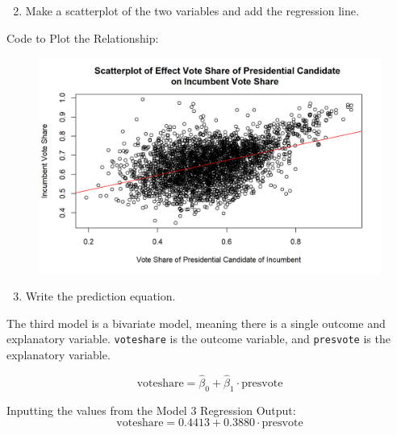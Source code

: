 \documentclass[12pt,letterpaper]{article}
\begin{document}
\newpage
\noindent\begin{enumerate}[left=0pt]
\setcounter{enumi}{1}	
		\item Make a scatterplot of the two variables and add the regression line. 
\end{enumerate}		

\noindent Code to Plot the Relationship:

\begin{figure}[H]
	\centering
	\includegraphics[width=1\textwidth]{Figure_3_1.png}
\end{figure}

\noindent\begin{enumerate}[left=0pt]		
\setcounter{enumi}{2}	
		\item Write the prediction equation.
	\end{enumerate}
	
\vspace{0.25cm}
\noindent The third model is a bivariate model, meaning there is a single outcome and explanatory variable.  \texttt{voteshare} is the outcome variable, and  \texttt{presvote} is the explanatory variable.

\begin{equation}
	\text{voteshare} = \hat{\beta}_0 + \hat{\beta}_1 \cdot \text{presvote}
\end{equation}

\vspace{0.5cm} \noindent Inputting the values from the Model 3 Regression Output:
\begin{equation}
	\text{voteshare} = 0.4413 + 0.3880 \cdot \text{presvote}
\end{equation}

\newpage	
\end{document}
